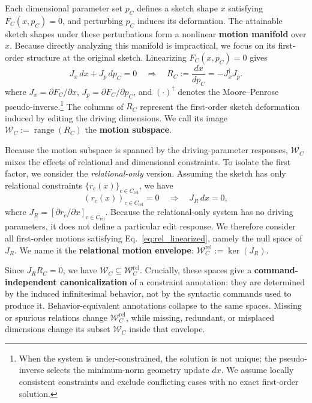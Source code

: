 Each dimensional parameter set $p_C$ defines a sketch shape $x$ satisfying $F_C(x,p_C)=0$, and perturbing $p_C$ induces its deformation. The attainable sketch shapes under these perturbations form a nonlinear \textbf{motion manifold} over $x$.
Because directly analyzing this manifold is impractical, we focus on its first-order structure at the original sketch. Linearizing $F_C(x,p_C)=0$ gives
\begin{equation}
    J_x \, dx + J_p \, dp_C = 0
    \quad \Longrightarrow \quad
    R_C := \frac{dx}{dp_C} = -J_x^\dagger J_p.
    \label{eq:full_linearized}
\end{equation}
where $J_x = \partial F_C / \partial x$, $J_p = \partial F_C / \partial p_C$, and $(\cdot)^\dagger$ denotes the Moore--Penrose pseudo-inverse.\footnote{When the system is under-constrained, the solution is not unique; the pseudo-inverse selects the minimum-norm geometry update $dx$. We assume locally consistent constraints and exclude conflicting cases with no exact first-order solution.}
The columns of $R_C$ represent the first-order sketch deformation induced by editing the driving dimensions.
We call its image $\mathcal{W}_C:=\operatorname{range}(R_C)$ the \textbf{motion subspace}.

Because the motion subspace is spanned by the driving-parameter responses, $\mathcal{W}_C$ mixes the effects of relational and dimensional constraints. To isolate the first factor, we consider the \textit{relational-only} version. Assuming the sketch has only relational constraints $\{r_c(x)\}_{c\in C_\mathrm{rel}}$, we have
\begin{equation}
(r_c(x))_{c\in C_\mathrm{rel}}=0 \quad \Longrightarrow \quad J_R\,dx=0, \label{eq:rel_linearized}
\end{equation}
where $J_R=\left[\partial r_c/\partial x\right]_{c\in C_{\mathrm{rel}}}$.
Because the relational-only system has no driving parameters, it does not define a particular edit response. We therefore consider all first-order motions satisfying Eq.~\ref{eq:rel_linearized}, namely the null space of $J_R$. We name it the \textbf{relational motion envelope}: $\mathcal{W}_C^\mathrm{rel}:=\ker(J_R)$.

Since $J_R R_C=0$, we have $\mathcal{W}_C\subseteq \mathcal{W}^\mathrm{rel}_C$. Crucially, these spaces give a \textbf{command-independent canonicalization} of a constraint annotation: they are determined by the induced infinitesimal behavior, not by the syntactic commands used to produce it. Behavior-equivalent annotations collapse to the same spaces. Missing or spurious relations change $\mathcal{W}_C^\mathrm{rel}$, while missing, redundant, or misplaced dimensions change its subset $\mathcal{W}_C$ inside that envelope.

